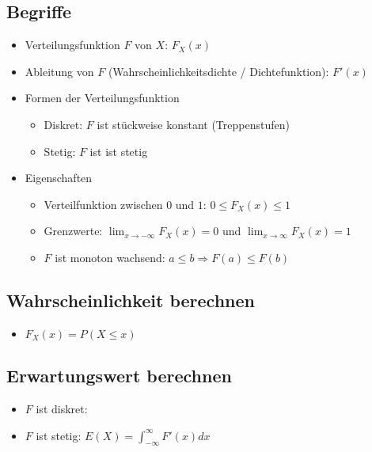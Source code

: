\subsection{Begriffe}
\begin{itemize}
  \item Verteilungsfunktion $F$ von $X$: $F_X(x)$
  \item Ableitung von $F$ (Wahrscheinlichkeitsdichte / Dichtefunktion):
    $F'(x)$
  \item Formen der Verteilungsfunktion
  \begin{itemize}
    \item Diskret: $F$ ist stückweise konstant (Treppenstufen)
    \item Stetig: $F$ ist ist stetig
  \end{itemize}
  \item Eigenschaften
  \begin{itemize}
    \item Verteilfunktion zwischen $0$ und $1$: $0 \le F_X(x) \le 1$
    \item Grenzwerte: $\lim_{x \to -\infty} F_X(x) = 0$ 
      und $\lim_{x \to \infty} F_X(x) = 1$
    \item $F$ ist monoton wachsend: $a \le b \Rightarrow F(a) \le F(b)$
  \end{itemize}
\end{itemize}
\subsection{Wahrscheinlichkeit berechnen}
\begin{itemize}
   \item $F_X(x) = P(X \le x)$
\end{itemize}
\subsection{Erwartungswert berechnen}
\begin{itemize}
  \item $F$ ist diskret: %
  \item $F$ ist stetig: $E(X) = \int_{-\infty}^{\infty}F'(x)dx$
\end{itemize}
